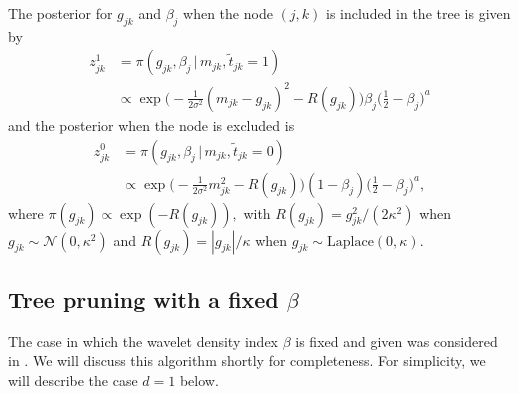 \documentclass[11pt,a4paper]{article}
\newcommand{\g}{{\, |\,}}
\newcommand{\Nn}{{\mathcal N}}
\begin{document}
The posterior for $g_{jk}$ and $\beta_j$ when the node $(j,k)$ is included in the tree is given by
\begin{align*}
z_{jk}^1 & =\pi(g_{jk},\beta_j \g m_{jk},\widetilde{t}_{jk}=1)\\
& \propto \exp\Big(-\frac{1}{2\sigma^2}(m_{jk}-g_{jk})^2-R(g_{jk})\Big)\beta_j\Big(\frac{1}{2}-\beta_j\Big)^a
\end{align*}
and the posterior when the node is excluded is 
\begin{align*}
z_{jk}^0 & =\pi(g_{jk},\beta_j \g m_{jk},\widetilde{t}_{jk}=0)\\
& \propto \exp\Big(-\frac{1}{2\sigma^2}m_{jk}^2-R(g_{jk})\Big)(1-\beta_j)\Big(\frac{1}{2}-\beta_j\Big)^a, 
\end{align*}
where $\pi(g_{jk})\propto\exp(-R(g_{jk})),$ with $R(g_{jk})={g_{jk}^2}/(2\kappa^2)$ when $g_{jk}\sim\Nn(0,\kappa^2)$ and $R(g_{jk})={|g_{jk}|}/\kappa$ when $g_{jk}\sim\text{Laplace}(0,\kappa)$. 


\subsection{Tree pruning with a fixed $\beta$}\label{Sec:PruningFixedBeta}

The case in which the wavelet density index $\beta$ is fixed and given was considered in \cite{Kekkonen2023}. We will discuss this algorithm shortly for completeness. For simplicity, we will describe the case $d=1$ below. 
\end{document}
